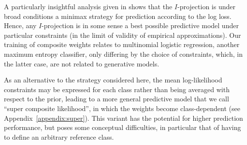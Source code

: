\documentclass[english]{scrartcl}
\begin{document}
A particularly insightful analysis given in \cite{Grunwald-04} shows that the $I$-projection is under broad conditions a minimax strategy for prediction according to the log loss. Hence, any $I$-projection is in some sense a best possible predictive model under particular constraints (in the limit of validity of empirical approximations). Our training of composite weights relates to multinomial logistic regression, another maximum entropy classifier, only differing by the choice of constraints, which, in the latter case, are not related to generative models.

As an alternative to the strategy considered here, the mean log-likelihood constraints may be expressed for each class rather than being averaged with respect to the prior, leading to a more general predictive model that we call ``super composite likelihood'', in which the weights become class-dependent (see Appendix~\ref{appendix:super}). This variant has the potential for higher prediction performance, but poses some conceptual difficulties, in particular that of having to define an arbitrary reference class. 







\end{document}
